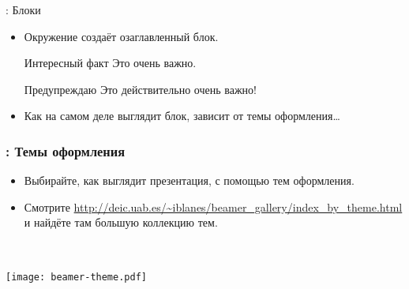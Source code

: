 \documentclass[usenames,dvipsnames]{beamer}
\begin{document}
\begin{frame}[fragile]{\insertsection: Блоки}
\begin{itemize}
\item Окружение  создаёт озаглавленный блок.
\begin{exampletwouptiny}
\begin{block}{Интересный факт}
Это очень важно.
\end{block}

\begin{alertblock}{Предупреждаю}
Это действительно очень важно!
\end{alertblock}
\end{exampletwouptiny}

\item Как на самом деле выглядит блок, зависит от темы оформления\dots
\end{itemize}
\end{frame}

\begin{frame}[fragile]
\frametitle{\insertsection: Темы оформления}
\vspace{-3ex}
\begin{itemize}
\item Выбирайте, как выглядит презентация, с помощью тем оформления.
\item Смотрите \url{http://deic.uab.es/~iblanes/beamer_gallery/index_by_theme.html}
и найдёте там большую коллекцию тем.
\end{itemize}
\begin{minipage}{0.56\linewidth}
\end{minipage}~~%
\begin{minipage}{0.5\linewidth}
\texttt{[image: beamer-theme.pdf]}
\end{minipage}
\end{frame}
\end{document}
